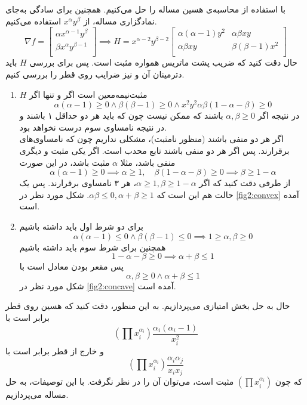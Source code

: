 با استفاده از محاسبه‌ی هسین مساله را حل می‌کنیم. همچنین برای سادگی به‌جای نمادگزاری مساله، از
$x^\alpha y^\beta$
استفاده می‌کنیم.
\[
\nabla f = \begin{bmatrix}
	\alpha x^{\alpha - 1}y^{\beta}\\
	\beta x^{\alpha}y^{\beta - 1}\\
\end{bmatrix}
\implies
H = x^{\alpha - 2}y^{\beta - 2}\begin{bmatrix}
\alpha (\alpha - 1)y^2 & \alpha \beta xy\\
 \alpha \beta xy & \beta (\beta - 1)x^2\\
\end{bmatrix}
\]
حال دقت کنید که ضریب پشت ماتریس همواره مثبت است. پس برای بررسی $H$ باید دترمینان آن و نیز ضرایب روی قطر را بررسی کنیم. \\
\begin{enumerate}
	\item 
	$H$ مثبت‌نیمه‌معین است اگر و تنها اگر
	\[
	\alpha (\alpha - 1) \ge 0 \land \beta (\beta - 1) \ge 0 \land x^2y^2\alpha \beta (1 - \alpha - \beta) \ge 0
	\]
	در نتیجه اگر 
	$\alpha, \beta \ge 0$
	باشند که ممکن نیست چون که 
	باید هر دو حداقل ۱ باشند و در نتیجه نامساوی سوم درست نخواهد بود.\\
	اگر هر دو منفی باشند (منظور نامثبت)، مشکلی نداریم چون که نامساوی‌های برقرارند. پس اگر هر دو منفی باشند تابع محدب است.
	اگر یکی مثبت و دیگری منفی باشد، مثلا $\alpha$ مثبت باشد، در این صورت
	\[
	\alpha (\alpha - 1) \ge 0 \implies \alpha \ge 1, \quad \beta(1 - \alpha - \beta) \ge 0 \implies
	\beta \ge 1 - \alpha 
	\]
	از طرفی دقت کنید که اگر 
	$\alpha \ge 1, \beta \ge 1- \alpha$،
	هر ۳ نامساوی برقرارند. پس یک حالت هم این است که 
	$\alpha\beta \le 0, \alpha + \beta \ge 1$.
	شکل مورد نظر در 
	\ref{fig2:convex}
	آمده است.
	\item 
برای دو شرط اول باید داشته باشیم
\[
\alpha(\alpha - 1) \le 0\land  \beta(\beta - 1) \le 0  \implies1 \ge  \alpha, \beta \ge 0
\]
همچنین  برای شرط سوم باید داشته باشیم
\[
1 - \alpha - \beta \ge 0 \implies \alpha + \beta \le 1
\]
پس مقعر بودن معادل است با
\[
\alpha, \beta \ge 0 \land \alpha + \beta \le 1
\]
شکل مورد نظر در 
\ref{fig2:concave}
آمده است.
\end{enumerate}
حال به حل بخش امتیازی می‌پردازیم. به این منظور، دقت کنید که هسین روی قطر برابر است با
\[
(\prod x_i^{\alpha_i} )\frac{\alpha_i (\alpha_i - 1)}{x_i^2}
\]
و خارج از قطر برابر است با
\[
(\prod x_i^{\alpha_i} )\frac{\alpha_i \alpha_j}{x_ix_j}
\]
که چون 
$(\prod x_i^{\alpha_i} )$
مثبت است، می‌توان آن را در نظر نگرفت. با این توصیفات، به حل مساله می‌پردازیم. 
